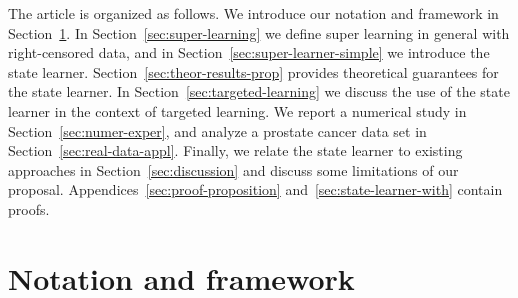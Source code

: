 \documentclass[a4,danish]{article}
\begin{document}

The article is organized as follows. We introduce our notation and framework in
Section~\ref{sec:framework}. In Section~\ref{sec:super-learning} we define super
learning in general with right-censored data, and in
Section~\ref{sec:super-learner-simple} we introduce the state learner.
Section~\ref{sec:theor-results-prop} provides theoretical guarantees for the
state learner. In Section~\ref{sec:targeted-learning} we discuss the use of the
state learner in the context of targeted learning. We report a numerical study
in Section~\ref{sec:numer-exper}, and analyze a prostate cancer data set in
Section~\ref{sec:real-data-appl}. Finally, we relate the state learner to
existing approaches in Section~\ref{sec:discussion} and discuss some limitations
of our proposal. Appendices~\ref{sec:proof-proposition}
and~\ref{sec:state-learner-with} contain proofs.

\section{Notation and framework}
\label{sec:framework}
\end{document}
